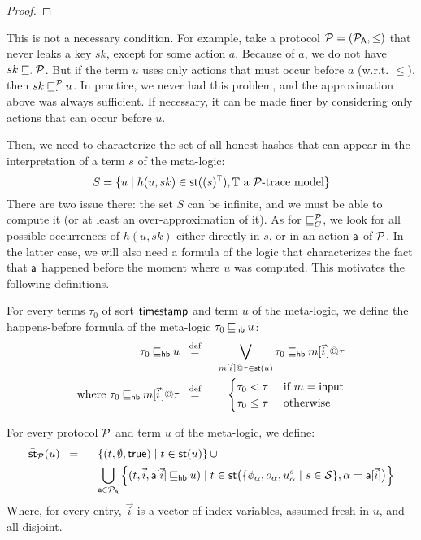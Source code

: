 \begin{proof}
\end{proof}

\begin{remark}
  This is not a necessary condition. For example, take a protocol $\mathcal{P} = (\mathcal{P}_{\textsf{A}},\le)$ that never leaks a key $sk$, except for some action $a$. Because of $a$, we do not have $sk \mathbin{\sqsubseteq}_{\cdot} \mathcal{P}$. But if the term $u$ uses only actions that must occur before $a$ (w.r.t. $\le$), then $sk \mathbin{\sqsubseteq}^{\mathcal{P}}_{\cdot} u$. In practice, we never had this problem, and the approximation above was always sufficient. If necessary, it can be made finer by considering only actions that can occur before $u$.
\end{remark}

Then, we need to characterize the set of all honest hashes that can appear in the interpretation of a term $s$ of the meta-logic:
\[
  S = \{u \mid h(u,sk) \in \mathsf{st}((s)^{\mathbb{T}}),
  \mathbb{T} \text{ a $\mathcal{P}$-trace model}\}
\]
There are two issue there: the set $S$ can be infinite, and we must be able to compute it (or at least an over-approximation of it). As for $\mathbin{\sqsubseteq}^{\mathcal{P}}_{C}$, we look for all possible occurrences of $h(u,sk)$ either directly in $s$, or in an action $\textsf{a}$ of $\mathcal{P}$. In the latter case, we will also need a formula of the logic that characterizes the fact that $\textsf{a}$ happened before the moment where $u$ was computed. This motivates the following definitions.

\begin{definition}
  For every terms $\tau_0$ of sort $\textsf{timestamp}$ and term $u$ of the meta-logic, we define the happens-before formula of the meta-logic $\tau_0 \mathbin{\sqsubseteq_{\textsf{hb}}} u$:
  \begin{alignat*}{2}
    \tau_0 \lehb u &\;\;\overset{\text{def}}{=}\;\;&
    \bigvee_{m[\pvec{i}]@\tau \in \st(u)}
    \tau_0 \lehb m[\pvec{i}]@\tau\\
    \text{where }\tau_0 \lehb m[\pvec{i}]@\tau  &\;\;\overset{\text{def}}{=}\;\;&
    \begin{cases}
      \tau_0 < \tau &\text{ if } m = \minp\\
      \tau_0 \le \tau &\text{ otherwise}
    \end{cases}
  \end{alignat*} 
\end{definition}

\begin{definition}
  For every protocol $\mathcal{P}$ and term $u$ of the meta-logic, we define:
  \begin{alignat*}{2}
    \bar{\mathsf{st}}_{\mathcal{P}}(u) &\;\;=\;\;&&
    \left\{
      (t, \emptyset, \textsf{true}) \mid t \in \mathsf{st}(u)
    \right\}
    \cup\\
    &&&\bigcup_{\textsf{a} \in \mathcal{P}_{\textsf{A}}}
    \left\{
      (t, \vec{i}, \textsf{a}[\vec{i}] \mathbin{\sqsubseteq_{\textsf{hb}}} u) \mid
      t \in \mathsf{st}\big(\{\phi_{\alpha},o_{\alpha},u^s_{\alpha} \mid s \in\mathcal{S}\},
      \alpha = \textsf{a}[\vec{i}]
      \big)
    \right\}
  \end{alignat*}
  Where, for every entry, $\vec{i}$ is a vector of index variables, assumed fresh in $u$, and all disjoint.
\end{definition}

